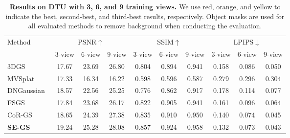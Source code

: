 \documentclass[letterpaper]{article} %
\begin{document}
\begin{table*}[!t]
    \centering
    \begin{tabular}{l|ccc|ccc|ccc}
        \toprule
        \multirow{2}{*}{Method}   & \multicolumn{3}{c|}{PSNR$\uparrow$}  & \multicolumn{3}{c|}{SSIM$\uparrow$}   & \multicolumn{3}{c}{LPIPS$\downarrow$} \\
        &  3-view & 6-view & 9-view & 3-view & 6-view & 9-view & 3-view & 6-view & 9-view \\
        \midrule
        3DGS~\cite{kerbl20233d} & 17.67 & \cellcolor[HTML]{FFFFD4}23.69 & \cellcolor[HTML]{FFFFD4}26.80 & 0.804 & 0.894 & \cellcolor[HTML]{FFFFD4}0.941 & \cellcolor[HTML]{FFFFD4}0.158 & \cellcolor[HTML]{FFFFD4}0.086 & \cellcolor[HTML]{FFFFD4}0.050 \\
        MVSplat~\cite{chen2024mvsplat} & 17.33 & 16.34 & 16.22 & 0.598 & 0.596 & 0.587 & 0.279 & 0.296 & 0.304 \\
        DNGaussian~\cite{li2024dngaussian} & \cellcolor[HTML]{FFFFD4}18.57 & 22.56 & 25.25 & 0.776 & 0.862 & 0.917 & 0.178 & 0.114 & 0.077 \\
        FSGS~\cite{zhu2024fsgs} & 17.84 & 23.68 & 26.17 & \cellcolor[HTML]{FFFFD4}0.822 & \cellcolor[HTML]{FFFFD4}0.905 & \cellcolor[HTML]{FFFFD4}0.941 & 0.161 & 0.096 & 0.064 \\
        CoR-GS~\cite{zhang2024cor} & \cellcolor[HTML]{FFE4CF}18.65 & \cellcolor[HTML]{FFE4CF}24.39 & \cellcolor[HTML]{FFE4CF}27.38 & \cellcolor[HTML]{FFE4CF}0.835 & \cellcolor[HTML]{FFE4CF}0.910 & \cellcolor[HTML]{FFE4CF}0.950 & \cellcolor[HTML]{FFE4CF}0.140 & \cellcolor[HTML]{FFE4CF}0.074 & \cellcolor[HTML]{FFE4CF}0.045 \\
        \textbf{SE-GS} & \cellcolor[HTML]{FFCCC9}19.24 & \cellcolor[HTML]{FFCCC9}25.28 & \cellcolor[HTML]{FFCCC9}28.08 & \cellcolor[HTML]{FFCCC9}0.857 & \cellcolor[HTML]{FFCCC9}0.924 & \cellcolor[HTML]{FFCCC9}0.958 & \cellcolor[HTML]{FFCCC9}0.132 & \cellcolor[HTML]{FFCCC9}0.073 & \cellcolor[HTML]{FFCCC9}0.043 \\
        \bottomrule
    \end{tabular}
    \caption{\textbf{Results on DTU with 3, 6, and 9 training views.} We use red, orange, and yellow to indicate the best, second-best, and third-best results, respectively. Object masks are used for all evaluated methods to remove background when conducting the evaluation.}
    \label{tab:dtu}
\end{table*}
\end{document}
